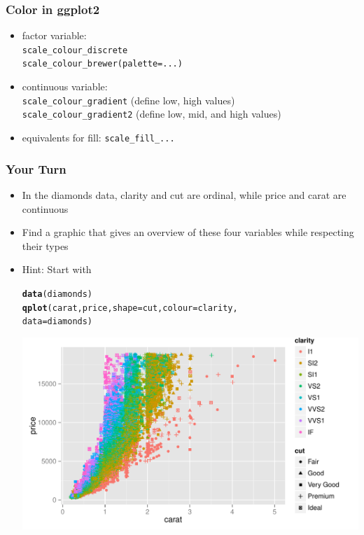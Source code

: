 \documentclass{beamer}\usepackage[]{graphicx}\usepackage[]{color}
\makeatletter
\newcommand{\hlstd}[1]{\textcolor[rgb]{0.345,0.345,0.345}{#1}}%
\newcommand{\hlkwc}[1]{\textcolor[rgb]{0.333,0.667,0.333}{#1}}%
\newcommand{\hlkwd}[1]{\textcolor[rgb]{0.737,0.353,0.396}{\textbf{#1}}}%
\newenvironment{kframe}{%
 \def\at@end@of@kframe{}%
 \ifinner\ifhmode%
  \def\at@end@of@kframe{\end{minipage}}%
  \begin{minipage}{\columnwidth}%
 \fi\fi%
 \def\FrameCommand##1{\hskip\@totalleftmargin \hskip-\fboxsep
 \colorbox{shadecolor}{##1}\hskip-\fboxsep
     \hskip-\linewidth \hskip-\@totalleftmargin \hskip\columnwidth}%
 \MakeFramed {\advance\hsize-\width
   \@totalleftmargin\z@ \linewidth\hsize
   \@setminipage}}%
 {\par\unskip\endMakeFramed%
 \at@end@of@kframe}
\newenvironment{knitrout}{}{} %
\makeatother
\begin{document}
\begin{frame}[fragile]
\frametitle{Color in ggplot2}
\begin{itemize}
\item factor variable: \\
\verb!scale_colour_discrete!\\
\verb!scale_colour_brewer(palette=...)!
\item continuous variable: \\
\verb!scale_colour_gradient! (define low, high values)\\
\verb!scale_colour_gradient2! (define low, mid, and high values)
\item equivalents for fill: \verb!scale_fill_...!
\end{itemize}
\end{frame}

\begin{frame}[fragile]
\frametitle{Your Turn}
\vspace{-12pt}
\small
\begin{itemize}
\item In the diamonds data, clarity and cut are ordinal, while price and carat are continuous
\item Find a graphic that gives an overview of these four variables while respecting their types
\item Hint: Start with \vspace{-4pt}
\begin{knitrout}\footnotesize
{}\color{fgcolor}\begin{kframe}
\begin{alltt}
\hlkwd{data}\hlstd{(diamonds)}
\hlkwd{qplot}\hlstd{(carat, price,} \hlkwc{shape}\hlstd{=cut,} \hlkwc{colour}\hlstd{=clarity,}
      \hlkwc{data}\hlstd{=diamonds)}
\end{alltt}
\end{kframe}

{\centering \includegraphics[width=.55\linewidth]{figure/yourturn2} 

}



\end{knitrout}
\vspace{-6pt}
\end{itemize}
\end{frame}
\end{document}
